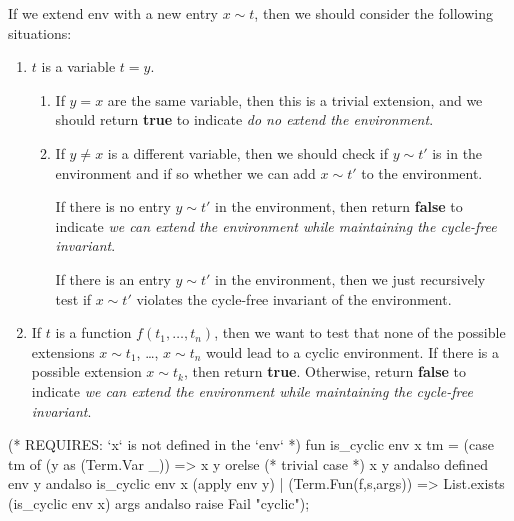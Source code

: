 \begin{node}
If we extend {\Tt{}env\nwendquote} with a new entry $x\sim t$, then we should
consider the following situations:
\begin{enumerate}
\item $t$ is a variable $t=y$.
  \begin{enumerate}
  \item If $y=x$ are the same variable, then this is a trivial
    extension, and we should return \textbf{true} to indicate \emph{do
    no extend the environment}.
  \item If $y\neq x$ is a different variable, then we should check if
    $y\sim t'$ is in the environment and if so whether we can add
    $x\sim t'$ to the environment.

    If there is no entry $y\sim t'$ in the environment, then return
    \textbf{false} to indicate \emph{we can extend the environment
    while maintaining the cycle-free invariant}.

    If there is an entry $y\sim t'$ in the environment, then we just
    recursively test if $x\sim t'$ violates the cycle-free invariant
    of the environment.
  \end{enumerate}
\item If $t$ is a function $f(t_{1},\dots,t_{n})$, then we want to test 
  that none of the possible extensions $x\sim t_{1}$, \dots, $x\sim t_{n}$
  would lead to a cyclic environment. If there is a possible extension
  $x\sim t_{k}$, then return \textbf{true}. Otherwise,
  return \textbf{false} to indicate \emph{we can extend the
  environment while maintaining the cycle-free invariant}.
\end{enumerate}
\end{node}

\nwenddocs{}\endmoddef\nwstartdeflinemarkup{}\nwenddeflinemarkup
(* REQUIRES: `x` is not defined in the `env` *)
fun is_cyclic env x tm =
 (case tm of
   (y as (Term.Var _)) =>  x y orelse (* trivial case *)
                           x y andalso
                          defined env y andalso
                          is_cyclic env x (apply env y)
 | (Term.Fun(f,s,args)) => List.exists (is_cyclic env x) args andalso
                           raise Fail "cyclic");
\nwendcode{}\nwdocspar

